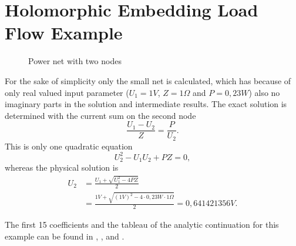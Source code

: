 \chapter{Holomorphic Embedding Load Flow Example}
\label{chap:helm_example}

\begin{figure}
	\centering
	
	\caption{Power net with two nodes}
	\label{fig:two_node_net}
\end{figure}

For the sake of simplicity only the small net  is calculated, which has because of only real valued input parameter ($U_1 = \si{1}{V}$, $Z = \si{1}{\Omega}$ and $P = \si{0,23}{W}$) also no imaginary parts in the solution and intermediate results. The exact solution is determined with the current sum on the second node
\begin{equation}
	\frac{U_1 - U_2}{Z} = \frac{P}{U_2}.
\end{equation}
This is only one quadratic equation
\begin{equation}
	U_2^2 - U_1 U_2 + P Z = 0,
\end{equation}
whereas the physical solution is
\begin{align}
	U_2 & = \frac{U_1 + \sqrt{U_1^2 - 4 P Z}}{2} \\
		& = \frac{\si{1}{V} + \sqrt{(\si{1}{V})^2 - 4 \cdot \si{0,23}{W} \cdot \si{1}{\Omega}}}{2} = \si{0,641421356}{V}.
\end{align}

The first 15 coefficients and the tableau of the analytic continuation for this example can be found in , ,  and .

